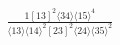 \documentclass[varwidth, border=5pt]{standalone}
\begin{document}
\begin{my}
$\begin{gathered}
\scriptscriptstyle\frac{1[13]^2⟨34⟩⟨15⟩^4}{⟨13⟩⟨14⟩^2[23]^2⟨24⟩⟨35⟩^2}
\end{gathered}$
\end{my}
\end{document}

